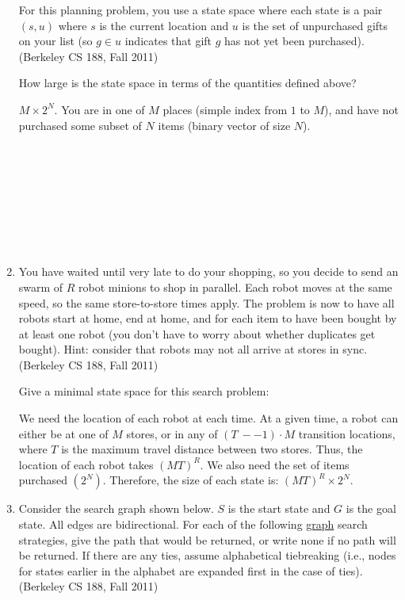 \documentclass[11pt]{article}
\begin{document}
\begin{enumerate}
For this planning problem, you use a state space where each state is a pair
$(s,u)$ where $s$ is the current location and $u$ is the set of unpurchased
gifts on your list (so $g \in u$ indicates that gift $g$ has not yet been purchased).
(Berkeley CS 188, Fall 2011)

How large is the state space in terms of the quantities defined above?

{\color{blue}
$M \times2^N.$
You are in one of
$M$
places (simple index from $1$ to
$M$), and have not purchased some subset of
$N$
items (binary vector of size
$N$).}

~\\ \\ \\ \\ \\ \\ \\

\item You have waited until very late to do your shopping, so you decide to send an swarm of
$R$ robot minions to
shop in parallel.  Each robot moves at the same speed, so the same
store-to-store times apply.  The problem
is now to have all robots start at home, end at home, and for each item
to have been bought by at least one
robot (you don’t have to worry about whether duplicates get bought).
Hint:  consider that robots may not all
arrive at stores in sync. (Berkeley CS 188, Fall 2011)

Give a minimal state space for this search problem:

{\color{blue}
We  need  the  location  of  each  robot  at  each  time.
At  a  given  time,  a  robot  can  either  be  at  one  of
$M$
stores, or in any of $(T ~- − 1) \cdot M$
transition locations, where
$T$
is the maximum travel distance between
two stores.  Thus, the location of each robot takes $(MT)^R$.
We also need the set of items purchased $(2^N)$.
Therefore, the size of each state is:  $(MT)^R\times 2^N.$}

\newpage
\item Consider the search graph shown below.
$S$ is the start state and $G$ is the goal state. All edges are bidirectional.
For each of the following \underline{graph} search strategies, give the path that would be returned,
or write none if no path will be returned. If there are any ties,
assume alphabetical tiebreaking (i.e., nodes for states earlier in the
alphabet are expanded first in the case of ties). (Berkeley CS 188, Fall
2011)


\end{enumerate}
\end{document}

